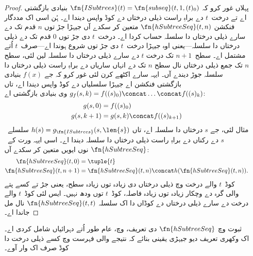 \documentclass[../../../include/open-logic-section]{subfiles}
\begin{document}
\begin{proof}
پہلاں غور کرو کہ $\fn{ISubtrees}(t) = \fn{subseq}(t, 1, (t)_0)$
بنیادی بازگشتی اے تے درخت~$t$ دے براہِ راست
ذیلی درختاں دے کوڈ واپس دیندا اے۔ ہُن اسی اک مددگار
فنکشن $\fn{hSubtreeSeq}(t,n)$ متعین کر سکدے آں
جیہڑا جڑ توں $n$ قدم تک دے سارے ذیلی درختاں دا
سلسلہ حساب کردا اے۔ درخت~$t$ دی جڑ توں $0$
قدم تک دے ذیلی درختاں دا سلسلہ—یعنی اوہ جیہڑا
درخت~$t$ دی جڑ توں شروع ہوندا اے—صرف~$t$
اُتے مشتمل اے۔ سطح~$n+1$ تک درخت $t$ دے سارے
ذیلی درختاں دا سلسلہ لین لئی، سطح $n$ تک جمع
ذیلی درختاں نال سطح $n$ تک دے انہاں ساریاں دے
براہِ راست ذیلی درختاں دا سلسلہ جوڑ دیندے آں۔
ایہہ سارے اکٹھے کرن لئی غور کرو کہ جے $f(x)$
بنیادی بازگشتی فنکشن اے جیہڑا سلسلیاں دے کوڈ واپس
دیندا اے، تاں $g_f(s, k) = f((s)_0) \concat
\dots \concat f((s)_k)$ وی بنیادی بازگشتی اے:
    \begin{align*}
      g(s, 0) & = f((s)_0)\\
      g(s, k+1) & = g(s, k) \concat f((s)_{k+1})
    \end{align*}
    مثال لئی، جے $s$ درختاں دا سلسلہ اے، تاں
    $h(s) = g_{\fn{ISubtrees}}(s, \len{s})$ سلسلے~$s$
    دے رکناں دے براہِ راست ذیلی درختاں دا سلسلہ دیندا
    اے۔ اسی ایہہ ورت کے~$\fn{hSubtreeSeq}$ نوں
    ایویں متعین کر سکدے آں:
    \begin{align*}
      \fn{hSubtreeSeq}(t, 0) & = \tuple{t} \\
      \fn{hSubtreeSeq}(t, n+1) & = \fn{hSubtreeSeq}(t, n) \concat
      h(\fn{hSubtreeSeq}(t, n)).
    \end{align*}
    کوڈ~$t$ والے درخت وچ ذیلی درختاں دی زیادہ توں
    زیادہ سطح، یعنی جڑ تے کسے پتے والی گرہ دے
    وچکار زیادہ توں زیادہ فاصلہ، کوڈ~$t$ توں ودھ نہیں۔
    ایس لئی کوڈ~$t$ والے درخت دے سارے ذیلی درختاں
    دے کوڈاں دا اک سلسلہ $\fn{hSubtreeSeq}(t, t)$
    نال مل جاندا اے۔
\end{proof}

\begin{prob}
  ثبوت وچ $\fn{hSubtreeSeq}$ دی تعریف،
   وچ، عام طور
  اُتے دہرائیاں شامل کردی اے۔ اک وکھری تعریف دیو
  جیہڑی یقینی بنائے کہ نتیجے والی فہرست وچ کسے
  ذیلی درخت دا کوڈ صرف اک وار آوے۔
\end{prob}
\end{document}
